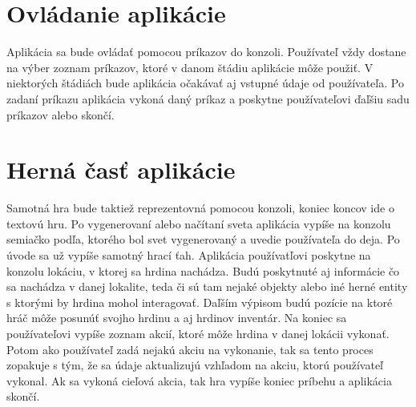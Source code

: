 \section{Ovládanie aplikácie}
Aplikácia sa bude ovládať pomocou príkazov do konzoli. Používateľ vždy dostane na výber zoznam príkazov, ktoré v danom štádiu aplikácie môže použiť. V niektorých štádiách bude aplikácia očakávať aj vstupné údaje od používateľa. Po zadaní príkazu aplikácia vykoná daný príkaz a poskytne používateľovi ďaľšiu sadu príkazov alebo skončí.
\section{Herná časť aplikácie}
Samotná hra bude taktiež reprezentovná pomocou konzoli, koniec koncov ide o textovú hru. Po vygenerovaní alebo načítaní sveta aplikácia vypíše na konzolu semiačko podľa, ktorého bol svet vygenerovaný a uvedie používateľa do deja. Po úvode sa už vypíše samotný hrací ťah. Aplikácia používatľovi poskytne na konzolu lokáciu, v ktorej sa hrdina nachádza. Budú poskytnuté aj informácie čo sa nachádza v danej lokalite, teda či sú tam nejaké objekty alebo iné herné entity s ktorými by hrdina mohol interagovať. Daľším výpisom budú pozície na ktoré hráč môže posunúť svojho hrdinu a aj hrdinov inventár. Na koniec sa používateľovi vypíše zoznam akcií, ktoré môže hrdina v danej lokácii vykonať. Potom ako používateľ zadá nejakú akciu na vykonanie, tak sa tento proces zopakuje s tým, že sa údaje aktualizujú vzhľadom na akciu, ktorú používateľ vykonal. Ak sa vykoná cieľová akcia, tak hra vypíše koniec príbehu a aplikácia skončí.


